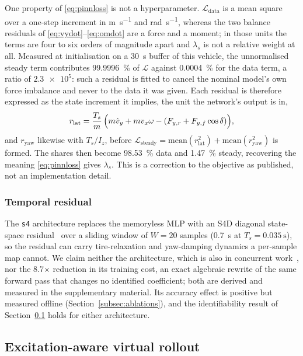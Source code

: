 One property of \eqref{eq:pinnloss} is not a hyperparameter.
$\mathcal{L}_{\mathrm{data}}$ is a mean square over a one-step increment in
\si{\meter\per\second} and \si{\radian\per\second}, whereas the two balance
residuals of \eqref{eq:vydot}--\eqref{eq:omdot} are a force and a moment; in
those units the terms are four to six orders of magnitude apart and
$\lambda_{s}$ is not a relative weight at all. Measured at initialisation on a
\SI{30}{\second} buffer of this vehicle, the unnormalised steady term
contributes \SI{99.9996}{\percent} of $\mathcal{L}$ against
\SI{0.0004}{\percent} for the data term, a ratio of $\num{2.3e5}$: such a
residual is fitted to cancel the nominal model's own force imbalance and never
to the data it was given. Each residual is therefore expressed as the state
increment it implies, the unit the network's output is in,
\begin{equation}
r_{\mathrm{lat}}=\frac{T_{s}}{m}\,\Big(m\dot v_{y}+mv_{x}\omega-(F_{y,r}+F_{y,f}\cos\delta)\Big),
\label{eq:physnorm}
\end{equation}
and $r_{\mathrm{yaw}}$ likewise with $T_{s}/I_{z}$, before
$\mathcal{L}_{\mathrm{steady}}=\mathrm{mean}(r_{\mathrm{lat}}^{2})+\mathrm{mean}(r_{\mathrm{yaw}}^{2})$
is formed. The shares then become \SI{98.53}{\percent} data and
\SI{1.47}{\percent} steady, recovering the meaning \eqref{eq:pinnloss} gives
$\lambda_{s}$. This is a correction to the objective as published, not an
implementation detail.

\subsubsection{Temporal residual}
\label{subsec:s4}
The \texttt{s4} architecture replaces the memoryless MLP with an S4D diagonal
state-space residual~\cite{gu2022s4d} over a sliding window of $W=20$ samples
(\SI{0.7}{\second} at $T_{s}=\SI{0.035}{\second}$), so the residual can carry
tire-relaxation and yaw-damping dynamics a per-sample map cannot. We claim
neither the architecture, which is also in concurrent
work~\cite{visionsysid2026}, nor the \num{8.7}$\times$ reduction in its
training cost, an exact algebraic rewrite of the same forward pass that changes
no identified coefficient; both are derived and measured in the supplementary
material. Its accuracy effect is positive but measured offline
(Section~\ref{subsec:ablations}), and the identifiability result of
Section~\ref{subsec:excitation} holds for either architecture.

\subsection{Excitation-aware virtual rollout}
\label{subsec:excitation}

